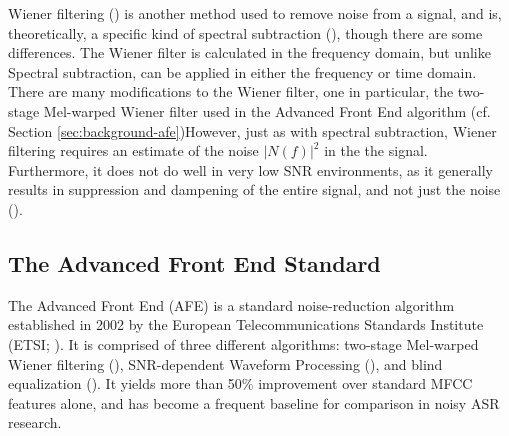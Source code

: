 Wiener filtering (\cite{lim:79}) is another method used to remove noise from a signal, and is, theoretically, a specific kind of spectral subtraction (\cite{agarwal:99}), though there are some differences. The Wiener filter is calculated in the frequency domain, but unlike Spectral subtraction, can be applied in either the frequency or time domain. There are many modifications to the Wiener filter, one in particular, the two-stage Mel-warped Wiener filter used in the Advanced Front End algorithm (cf. Section \ref{sec:background-afe})\DIFdelbegin {}\DIFdelend \DIFaddbegin {}\DIFaddend However, just as with spectral subtraction, Wiener filtering requires an estimate of the noise $|N(f)|^2$ in the the signal.  Furthermore, it does not do well in very low SNR environments, as it generally results in suppression and dampening of the entire signal, and not just the noise (\cite{li:14}).


\DIFdelbegin \subsubsection{}%
\addtocounter{subsubsection}{-1}%
\DIFdelend \DIFaddbegin \subsection{The Advanced Front End Standard}\DIFaddend \label{sec:background-afe}

The Advanced Front End (AFE) is a standard noise-reduction algorithm established in 2002 by the European Telecommunications Standards Institute (ETSI; \cite{etsi:02}).  It is comprised of three different algorithms: two-stage Mel-warped Wiener filtering (\cite{agarwal:99}), SNR-dependent Waveform Processing (\cite{macho:01}), and blind equalization (\cite{mauuary:98}).  It yields more than 50\% improvement over standard MFCC features alone, and has become a frequent baseline for comparison in noisy ASR research.

